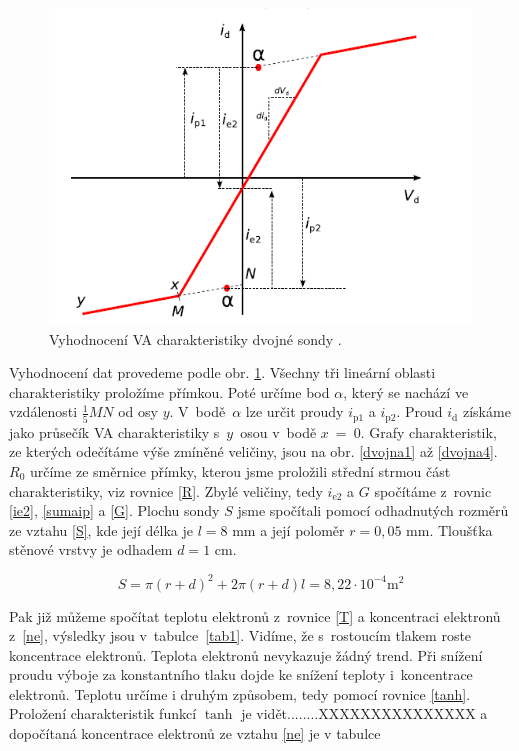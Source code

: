 \documentclass[a4paper,12pt]{article}
\begin{document}
\begin{figure}[h]
	\centering
	\includegraphics[width=130mm]{VAmerenidvojna.png}
	\caption{Vyhodnocení VA charakteristiky dvojné sondy \cite{navod}.}
	\label{VAmerenidvojna}
\end{figure}
Vyhodnocení dat provedeme podle obr. \ref{VAmerenidvojna}.
Všechny tři lineární oblasti charakteristiky proložíme přímkou.
Poté určíme bod $\alpha$, který se nachází ve vzdálenosti
$\frac{1}{5}MN$ od osy $y$. V~bodě~$\alpha$ lze určit proudy
$i_\text{{p1}}$ a $i_\text{{p2}}$. Proud $i_\text{{d}}$
získáme jako průsečík VA charakteristiky s~$y$~osou v~bodě
$x$~=~0. Grafy charakteristik, ze kterých odečítáme výše
zmíněné veličiny, jsou na obr. \ref{dvojna1} až \ref{dvojna4}.
$R_0$ určíme ze směrnice přímky, kterou jsme proložili
střední strmou část charakteristiky, viz rovnice \eqref{R}.
Zbylé veličiny, tedy $i_\text{{e2}}$ a $G$ spočítáme z~rovnic
\eqref{ie2}, \eqref{sumaip} a \eqref{G}. Plochu sondy $S$
jsme spočítali pomocí odhadnutých rozměrů ze vztahu \eqref{S},
kde její délka je $l = 8$ \si{\milli\meter} a její poloměr
$r = 0,05$ \si{\milli\meter}. Tloušťka stěnové
vrstvy je odhadem $d = 1$ \si{\centi\meter}.

\begin{equation}
	S = \pi (r+d)^2 + 2\pi (r+d) l = 8,22\cdot 10^{-4} \si{\meter\squared}
	\label{S}
\end{equation}

Pak již můžeme
spočítat teplotu elektronů z~rovnice \eqref{T} a koncentraci
elektronů z~\eqref{ne}, výsledky jsou v~tabulce~\ref{tab1}.
Vidíme, že s~rostoucím tlakem roste koncentrace elektronů.
Teplota elektronů nevykazuje žádný trend. Při snížení proudu
výboje za konstantního tlaku dojde ke snížení teploty i~koncentrace
elektronů.
\newpage
Teplotu určíme i druhým způsobem, tedy pomocí rovnice
\eqref{tanh}. Proložení charakteristik funkcí $\tanh$
je vidět........XXXXXXXXXXXXXXX
a dopočítaná koncentrace elektronů ze vztahu \eqref{ne}
je v tabulce
\end{document}
